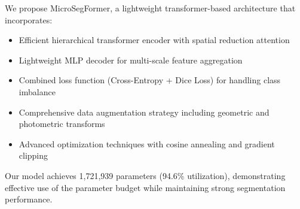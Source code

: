 We propose MicroSegFormer, a lightweight transformer-based architecture that incorporates:

\begin{itemize}
    \item Efficient hierarchical transformer encoder with spatial reduction attention
    \item Lightweight MLP decoder for multi-scale feature aggregation
    \item Combined loss function (Cross-Entropy + Dice Loss) for handling class imbalance
    \item Comprehensive data augmentation strategy including geometric and photometric transforms
    \item Advanced optimization techniques with cosine annealing and gradient clipping
\end{itemize}

Our model achieves 1,721,939 parameters (94.6\% utilization), demonstrating effective use of the parameter budget while maintaining strong segmentation performance.
